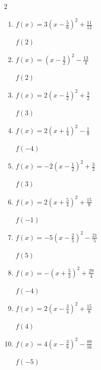 \begin{multicols}{2}
\begin{enumerate}
$f(4)$
        \phantom{$=-27$}

\columnbreak %

\resetques

  \item $\displaystyle f(x)=3\left( x-\frac{5}{6}\right)^{2}+\frac{11}{12}$

$f(2)$
        \phantom{$=5$}

  \item $\displaystyle f(x)=\left( x-\frac{3}{2}\right)^{2}-\frac{13}{4}$

$f(2)$
        \phantom{$=-3$}

  \item $\displaystyle f(x)=2\left( x-\frac{1}{2}\right)^{2}+\frac{3}{2}$

$f(3)$
        \phantom{$=14$}

  \item $\displaystyle f(x)=2\left( x+\frac{1}{4}\right)^{2}-\frac{1}{8}$

$f(-4)$
        \phantom{$=28$}

  \item $\displaystyle f(x)=-2\left( x-\frac{1}{2}\right)^{2}+\frac{3}{2}$

$f(3)$
        \phantom{$=-11$}

\columnbreak %

  \item $\displaystyle f(x)=2\left( x+\frac{5}{4}\right)^{2}+\frac{15}{8}$

$f(-1)$
        \phantom{$=2$}

  \item $\displaystyle f(x)=-5\left( x-\frac{2}{5}\right)^{2}-\frac{21}{5}$

$f(5)$
        \phantom{$=-110$}

  \item $\displaystyle f(x)=-\left( x+\frac{5}{2}\right)^{2}+\frac{29}{4}$

$f(-4)$
        \phantom{$=5$}

  \item $\displaystyle f(x)=2\left( x-\frac{3}{4}\right)^{2}+\frac{15}{8}$

$f(4)$
        \phantom{$=23$}

  \item $\displaystyle f(x)=4\left( x-\frac{3}{8}\right)^{2}-\frac{89}{16}$

$f(-5)$
        \phantom{$=110$}

\columnbreak %

\resetques


\end{enumerate}
\end{multicols}
